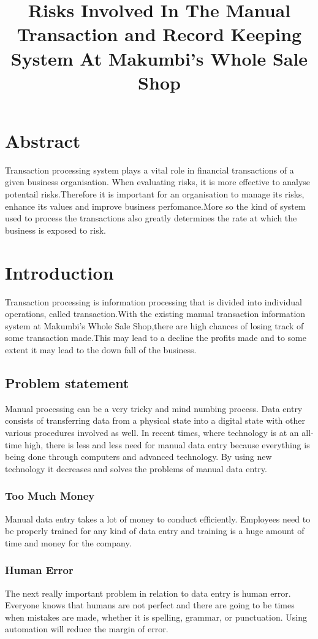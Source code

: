 \documentclass[12pt]{article}
\title{Risks Involved In The Manual Transaction and Record Keeping System At Makumbi's Whole Sale Shop}
\begin{document}
\maketitle
\section{Abstract}
Transaction processing system plays a vital role in financial transactions of a given business organisation. When evaluating risks, it is more effective to analyse potentail risks.Therefore it is important for an organisation to manage its risks, enhance its values and improve business perfomance.More so the kind of system used to process the transactions also greatly determines the rate at which the business is exposed to risk. 
\section{Introduction}
Transaction processing is information processing that is divided into individual operations, called transaction.With the existing manual transaction information system at Makumbi's Whole Sale Shop,there are high chances of losing track of some transaction made.This may lead to a decline the profits made and to some extent it may lead to the down fall of the business. \\

\subsection{Problem statement}
Manual processing can be a very tricky and mind numbing process. Data entry consists of transferring data from a physical state into a digital state with other various procedures involved as well. In recent times, where technology is at an all-time high, there is less and less need for manual data entry because everything is being done through computers and advanced technology. By using new technology it decreases and solves the problems of manual data entry.
\subsubsection{Too Much Money}
Manual data entry takes a lot of money to conduct efficiently. Employees need to be properly trained for any kind of data entry and training is a huge amount of time and money for the company.
\subsubsection{Human Error}
The next really important problem in relation to data entry is human error. Everyone knows that humans are not perfect and there are going to be times when mistakes are made, whether it is spelling, grammar, or punctuation. Using automation will reduce the margin of error.
\end{document}
